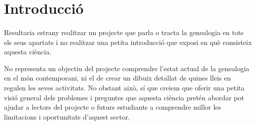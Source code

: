 \section{Introducció}

    \paragraph{}
    Resultaria estrany realitzar un projecte que parla o tracta la genealogia en tots els seus apartats i no realitzar una petita introducció que exposi en què consisteix aquesta ciència.

    No representa un objectiu del projecte comprendre l’estat actual de la genealogia en el món contemporani, ni el de crear un dibuix detallat de quines lleis en regulen les seves activitats. No obstant això, sí que creiem que oferir una petita visió general dels problemes i preguntes que aquesta ciència pretén abordar pot ajudar a lectors del projecte o futurs estudiants a comprendre millor les  limitacions i oportunitats d'aquest sector.

